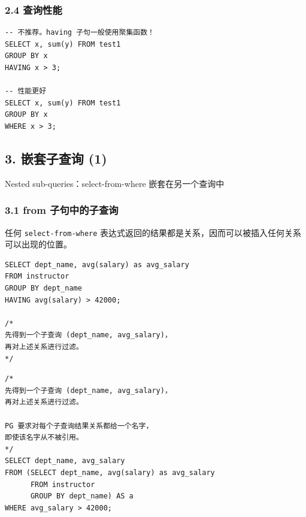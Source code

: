 \documentclass[aspectratio=169, 14pt]{beamer}
\begin{document}
\begin{frame}[fragile]
	\frametitle{2.4 查询性能}
	\begin{verbatim} 
-- 不推荐。having 子句一般使用聚集函数！
SELECT x, sum(y) FROM test1 
GROUP BY x 
HAVING x > 3;

-- 性能更好
SELECT x, sum(y) FROM test1 
GROUP BY x 
WHERE x > 3;
    \end{verbatim}



\end{frame}

\begin{frame}[fragile]
	\section{\textcolor{darkmidnightblue}{3. 嵌套子查询 (1)}}
	Nested sub-queries：\alert{select-from-where} 嵌套在另一个查询中

\end{frame}

\begin{frame}[fragile]
	\frametitle{3.1 from 子句中的子查询}
	任何 \texttt{select-from-where} 表达式返回的结果都是关系，因而可以被插入任何关系可以出现的位置。

	\begin{verbatim}
SELECT dept_name, avg(salary) as avg_salary
FROM instructor
GROUP BY dept_name
HAVING avg(salary) > 42000;

/*
先得到一个子查询 (dept_name, avg_salary)，
再对上述关系进行过滤。
*/
    \end{verbatim}

\end{frame}

\begin{frame}[fragile]

	\begin{verbatim}
/*
先得到一个子查询 (dept_name, avg_salary)，
再对上述关系进行过滤。

PG 要求对每个子查询结果关系都给一个名字，
即使该名字从不被引用。
*/
SELECT dept_name, avg_salary
FROM (SELECT dept_name, avg(salary) as avg_salary
      FROM instructor
      GROUP BY dept_name) AS a
WHERE avg_salary > 42000;
    \end{verbatim}

\end{frame}
\end{document}
